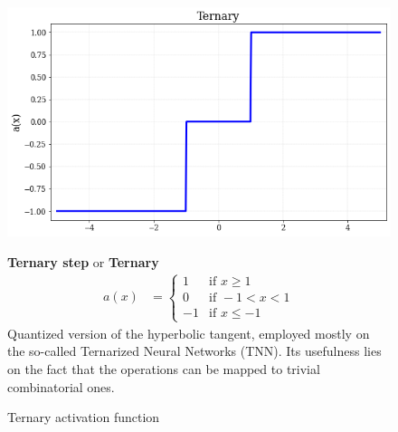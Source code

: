 \begin{figure}[!h]
\begin{minipage}{0.45\textwidth}

    \centering
\includegraphics[width=\textwidth]{sections/03/Images/Ternary.png}
\caption{Ternary activation function}
    \label{fig:act_ter}
\end{minipage}
\hfill
\begin{minipage}{0.5\textwidth}
    \textbf{Ternary step} or \textbf{Ternary}
   \begin{align}
        a(x) &=
        \begin{cases}
        1   & \text{if } x \geq 1 \\
        0   & \text{if } -1 < x < 1 \\
        -1  & \text{if } x \leq -1
        \end{cases}
    \end{align}
   Quantized version of the hyperbolic tangent, employed mostly on the so-called Ternarized Neural Networks (TNN). Its usefulness lies on the fact that the operations can be mapped to trivial combinatorial ones. 
\end{minipage}
\end{figure}  


